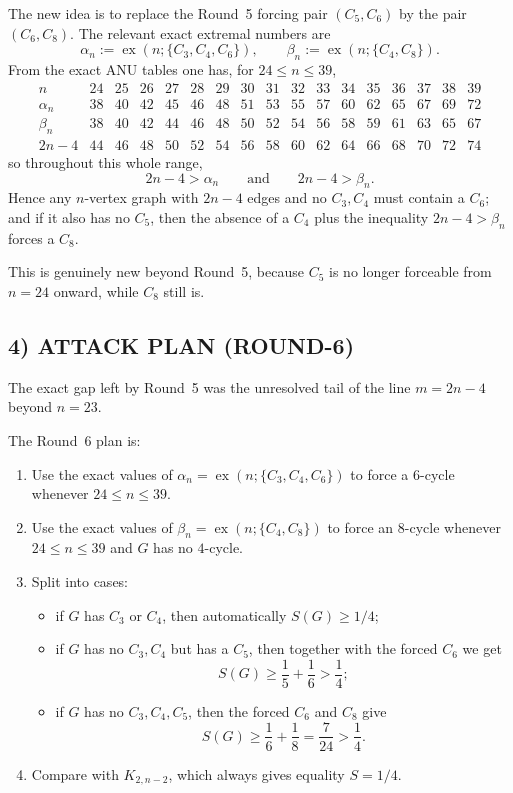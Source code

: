 The new idea is to replace the Round~5 forcing pair $(C_5,C_6)$ by the pair $(C_6,C_8)$.
The relevant exact extremal numbers are
\[
\alpha_n:=\operatorname{ex}(n;\{C_3,C_4,C_6\}),
\qquad
\beta_n:=\operatorname{ex}(n;\{C_4,C_8\}).
\]
From the exact ANU tables one has, for $24\le n\le 39$,
\[
\begin{array}{c|cccccccccccccccc}
 n & 24&25&26&27&28&29&30&31&32&33&34&35&36&37&38&39\\\hline
 \alpha_n & 38&40&42&45&46&48&51&53&55&57&60&62&65&67&69&72\\
 \beta_n  & 38&40&42&44&46&48&50&52&54&56&58&59&61&63&65&67\\
 2n-4      & 44&46&48&50&52&54&56&58&60&62&64&66&68&70&72&74
\end{array}
\]
so throughout this whole range,
\[
2n-4>\alpha_n
\qquad\text{and}\qquad
2n-4>\beta_n.
\]
Hence any $n$-vertex graph with $2n-4$ edges and no $C_3,C_4$ must contain a $C_6$; and if it also has no $C_5$, then the absence of a $C_4$ plus the inequality $2n-4>\beta_n$ forces a $C_8$.

This is genuinely new beyond Round~5, because $C_5$ is no longer forceable from $n=24$ onward, while $C_8$ still is.

\subsection*{4) ATTACK PLAN (ROUND-6)}

The exact gap left by Round~5 was the unresolved tail of the line $m=2n-4$ beyond $n=23$.

The Round~6 plan is:
\begin{enumerate}
\item Use the exact values of $\alpha_n=\operatorname{ex}(n;\{C_3,C_4,C_6\})$ to force a $6$-cycle whenever $24\le n\le 39$.
\item Use the exact values of $\beta_n=\operatorname{ex}(n;\{C_4,C_8\})$ to force an $8$-cycle whenever $24\le n\le 39$ and $G$ has no $4$-cycle.
\item Split into cases:
  \begin{itemize}
  \item if $G$ has $C_3$ or $C_4$, then automatically $S(G)\ge 1/4$;
  \item if $G$ has no $C_3,C_4$ but has a $C_5$, then together with the forced $C_6$ we get
  \[
  S(G)\ge \frac15+\frac16>\frac14;
  \]
  \item if $G$ has no $C_3,C_4,C_5$, then the forced $C_6$ and $C_8$ give
  \[
  S(G)\ge \frac16+\frac18=\frac7{24}>\frac14.
  \]
  \end{itemize}
\item Compare with $K_{2,n-2}$, which always gives equality $S=1/4$.
\end{enumerate}

